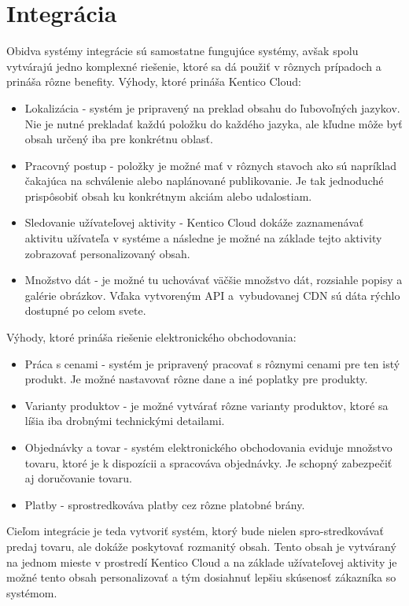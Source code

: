 \documentclass[
  printed, %
  table,   %
  lof,     %
  nolot,     %
  twoside,  
]{fithesis3}
\begin{document}
\chapter{Integrácia}
Obidva systémy integrácie sú samostatne fungujúce systémy, avšak spolu vytvárajú jedno komplexné riešenie, ktoré sa dá použiť v rôznych prípadoch a prináša rôzne benefity. Výhody, ktoré prináša Kentico Cloud: 
\begin{itemize}
	\item Lokalizácia - systém je pripravený na preklad obsahu do ľubovoľných jazykov. Nie je nutné prekladať každú položku do každého jazyka, ale kľudne môže byť obsah určený iba pre konkrétnu oblasť.
	\item Pracovný postup - položky je možné mať v rôznych stavoch ako sú napríklad čakajúca na schválenie alebo naplánované publikovanie. Je tak jednoduché prispôsobiť obsah ku konkrétnym akciám alebo udalostiam.
 	\item Sledovanie užívateľovej aktivity - Kentico Cloud dokáže zaznamenávať aktivitu užívateľa v systéme a následne je možné na základe tejto aktivity zobrazovať personalizovaný obsah.
 	\item Množstvo dát - je možné tu uchovávať väčšie množstvo dát, rozsiahle popisy a galérie obrázkov. Vďaka vytvoreným API a~vybudovanej CDN sú dáta rýchlo dostupné po celom svete.
\end{itemize}

Výhody, ktoré prináša riešenie elektronického obchodovania:
\begin{itemize}
	\item Práca s cenami - systém je pripravený pracovať s rôznymi cenami pre ten istý produkt. Je možné nastavovať rôzne dane a iné poplatky pre produkty.
	\item Varianty produktov - je možné vytvárať rôzne varianty produktov, ktoré sa líšia iba drobnými technickými detailami.
 	\item Objednávky a tovar - systém elektronického obchodovania eviduje množstvo tovaru, ktoré je k dispozícii a spracováva objednávky. Je schopný zabezpečiť aj doručovanie tovaru.
 	\item Platby - sprostredkováva platby cez rôzne platobné brány.
\end{itemize}

Cieľom integrácie je teda vytvoriť systém, ktorý bude nielen spro-stredkovávať predaj tovaru, ale dokáže poskytovať rozmanitý obsah. Tento obsah je vytváraný na jednom mieste v prostredí Kentico Cloud a na základe užívateľovej aktivity je možné tento obsah personalizovať a tým dosiahnuť lepšiu skúsenosť zákazníka so systémom.
\end{document}
